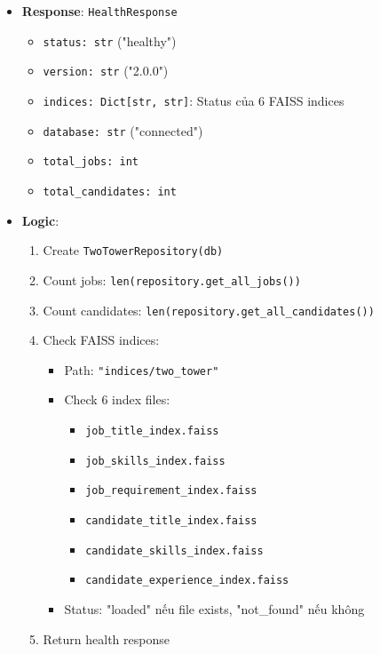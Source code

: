 \begin{itemize}
    \item \textbf{Response}: \texttt{HealthResponse}
    \begin{itemize}
        \item \texttt{status: str} ("healthy")
        \item \texttt{version: str} ("2.0.0")
        \item \texttt{indices: Dict[str, str]}: Status của 6 FAISS indices
        \item \texttt{database: str} ("connected")
        \item \texttt{total\_jobs: int}
        \item \texttt{total\_candidates: int}
    \end{itemize}
    
    \item \textbf{Logic}:
    \begin{enumerate}
        \item Create \texttt{TwoTowerRepository(db)}
        \item Count jobs: \texttt{len(repository.get\_all\_jobs())}
        \item Count candidates: \texttt{len(repository.get\_all\_candidates())}
        \item Check FAISS indices:
        \begin{itemize}
            \item Path: \texttt{"indices/two\_tower"}
            \item Check 6 index files:
            \begin{itemize}
                \item \texttt{job\_title\_index.faiss}
                \item \texttt{job\_skills\_index.faiss}
                \item \texttt{job\_requirement\_index.faiss}
                \item \texttt{candidate\_title\_index.faiss}
                \item \texttt{candidate\_skills\_index.faiss}
                \item \texttt{candidate\_experience\_index.faiss}
            \end{itemize}
            \item Status: "loaded" nếu file exists, "not\_found" nếu không
        \end{itemize}
        \item Return health response
    \end{enumerate}
\end{itemize}

